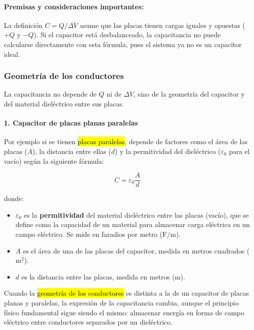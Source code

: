\paragraph{Premisas y consideraciones importantes:}

La definición \( C = Q/\Delta V \) asume que las placas tienen cargas iguales y opuestas (\( +Q \) y \( -Q \)). Si el capacitor está desbalanceado, la capacitancia no puede calcularse directamente con esta fórmula, pues el sistema ya no es un capacitor ideal.

\subsubsection{Geometría de los conductores}

La capacitancia no depende de \(Q\) ni de \(\Delta V\), sino de la geometría del capacitor y del material dieléctrico entre sus placas.

\paragraph{1. Capacitor de placas planas paralelas}

Por ejemplo si se tienen \hl{placas paralelas}, depende de factores como el área de las placas (\(A\)), la distancia entre ellas (\(d\)) y la permitividad del dieléctrico (\( \varepsilon_0 \) para el vacío) según la siguiente fórmula:

\[
C = \varepsilon_0 \frac{A}{d}
\]

donde:
\begin{itemize}
    \item \( \varepsilon_0 \) es la \textbf{permitividad} del material dieléctrico entre las placas (vacío), que se define como la capacidad de un material para almacenar carga eléctrica en un campo eléctrico. Se mide en faradios por metro (\(\si{\farad\per\meter}\)).
    \item \( A \) es el área de una de las placas del capacitor, medida en metros cuadrados (\(\si{\meter\squared}\)).
    \item \( d \) es la distancia entre las placas, medida en metros (\(\si{\meter}\)).
\end{itemize}

Cuando la \hl{geometría de los conductores} es distinta a la de un capacitor de placas planas y paralelas, la expresión de la capacitancia cambia, aunque el principio físico fundamental sigue siendo el mismo: almacenar energía en forma de campo eléctrico entre conductores separados por un dieléctrico.

